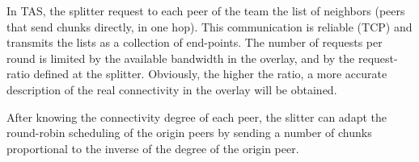 
\label{sec:TAS}

In TAS, the splitter request to each peer of the team the list of
neighbors (peers that send chunks directly, in one hop). This
communication is reliable (TCP) and transmits the lists as a
collection of end-points. The number of requests per round is limited
by the available bandwidth in the overlay, and by the request-ratio
defined at the splitter. Obviously, the higher the ratio, a more
accurate description of the real connectivity in the overlay will be
obtained.


After knowing the connectivity degree of each peer, the slitter can
adapt the round-robin scheduling of the origin peers by sending a
number of chunks proportional to the inverse of the degree of the
origin peer.


